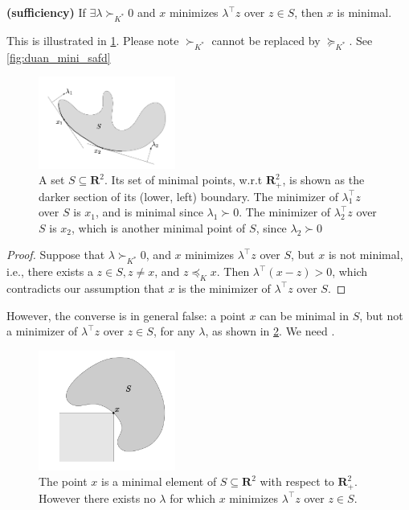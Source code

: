 \documentclass{article}
\newcommand{\bfs}[1]{\textbf{({#1}) }}
\begin{document}
\begin{lema}{\bfs{sufficiency}}\label{lem:ss}
  If $\exists \lambda \succ_{K^{*}} 0$ and $x$ minimizes $\lambda^{\top} z$ over $z \in S$, then $x$ is minimal. 
\end{lema}
\begin{rema}
This is illustrated in \cref{fig:duan_mini_s}. Please note $\succ_{K^{*}}$ cannot be replaced by $\succeq_{K^{*}}$. See \cref{fig:duan_mini_safd}
\end{rema}
\begin{figure}[H]
    \centering
    \includegraphics[width=0.4\textwidth]{Figs/2.png}
    \caption{A set $S \subseteq \mathbf{R}^{2}$. Its set of minimal points, w.r.t $\mathbf{R}_{+}^{2}$, is shown as the darker section of its (lower, left) boundary. The minimizer of $\lambda_{1}^{\top} z$ over $S$ is $x_{1}$, and is minimal since $\lambda_{1} \succ 0 .$ The minimizer of $\lambda_{2}^{\top} z$ over $S$ is $x_{2}$, which is another minimal point of $S$, since $\lambda_{2} \succ 0$}
    \label{fig:duan_mini_s}
\end{figure}
\begin{proof}\color{ForestGreen}
Suppose that $\lambda \succ_{K^{*}} 0$, and $x$ minimizes $\lambda^{\top} z$ over $S$, but $x$ is not minimal, i.e., there exists a $z \in S, z \neq x$, and $z \preceq_{K} x$. Then $\lambda^{\top}(x-z)>0$, which contradicts our assumption that $x$ is the minimizer of $\lambda^{\top} z$ over $S$.
\end{proof} 
However, the converse is in general false: a point $x$ can be minimal in $S$, but not a minimizer of $\lambda^{\top} z$ over $z \in S$, for any $\lambda$, as shown in \cref{fig:duan_mini_nf}.  We need .
\begin{figure}
    \centering
    \includegraphics[width=0.4\textwidth]{Figs/3.png}
    \caption{The point $x$ is a minimal element of $S \subseteq \mathbf{R}^{2}$ with respect to $\mathbf{R}_{+}^{2} .$ However there exists no $\lambda$ for which $x$ minimizes $\lambda^{\top} z$ over $z \in S$.}
    \label{fig:duan_mini_nf}
\end{figure}
\end{document}

